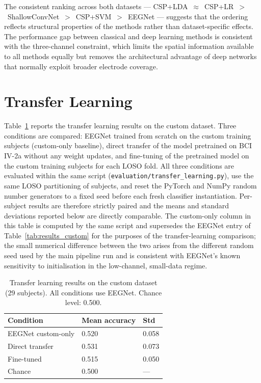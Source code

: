 \documentclass[english, bc, kiv, he, iso690alph, pdf]{fasthesis}
\begin{document}
The consistent ranking across both datasets — CSP+LDA~$\approx$~CSP+LR~$>$~ShallowConvNet~$>$~CSP+SVM~$>$~EEGNet — suggests that the ordering reflects structural properties of the methods rather than dataset-specific effects. The performance gap between classical and deep learning methods is consistent with the three-channel constraint, which limits the spatial information available to all methods equally but removes the architectural advantage of deep networks that normally exploit broader electrode coverage.

\section{Transfer Learning}

Table~\ref{tab:results_tl} reports the transfer learning results on the custom dataset. Three conditions are compared: EEGNet trained from scratch on the custom training subjects (custom-only baseline), direct transfer of the model pretrained on BCI IV-2a without any weight updates, and fine-tuning of the pretrained model on the custom training subjects for each LOSO fold. All three conditions are evaluated within the same script (\texttt{evaluation/transfer\_learning.py}), use the same LOSO partitioning of subjects, and reset the PyTorch and NumPy random number generators to a fixed seed before each fresh classifier instantiation. Per-subject results are therefore strictly paired and the means and standard deviations reported below are directly comparable. The custom-only column in this table is computed by the same script and supersedes the EEGNet entry of Table~\ref{tab:results_custom} for the purposes of the transfer-learning comparison; the small numerical difference between the two arises from the different random seed used by the main pipeline run and is consistent with EEGNet's known sensitivity to initialisation in the low-channel, small-data regime.

\begin{table}[ht]
    \centering
    \caption{Transfer learning results on the custom dataset (29 subjects). All conditions use EEGNet. Chance level: 0.500.}
    \label{tab:results_tl}
    \begin{tabular}{lll}
        \hline
        \textbf{Condition} & \textbf{Mean accuracy} & \textbf{Std} \\
        \hline
        EEGNet custom-only  & 0.520 & 0.058 \\
        Direct transfer     & 0.531 & 0.073 \\
        Fine-tuned          & 0.515 & 0.050 \\
        \hline
        Chance              & 0.500 & —     \\
        \hline
    \end{tabular}
\end{table}
\end{document}
